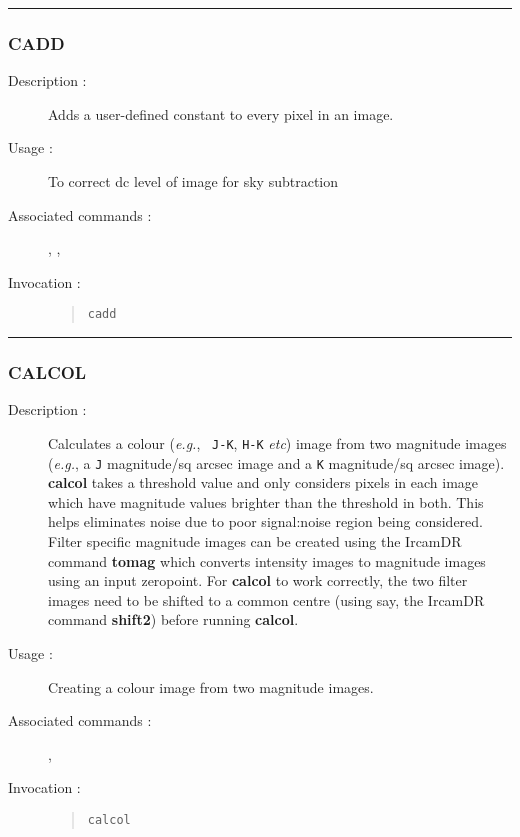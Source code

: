 \hrule 
\subsubsection*{\label{CADD}CADD}

\begin{description}

\item[Description :] Adds a user-defined constant to every pixel in an image.  

\item[Usage :] To correct dc level of image for sky subtraction

\item[Associated commands :] {\tt {}}, 
{\tt {}}, {\tt {}}

\item[Invocation :]

\begin{quote}{\tt  cadd  }\end{quote}

\end{description}

\hrule 
\subsubsection*{\label{CALCOL}CALCOL}

\begin{description}

\item[Description :] Calculates a colour (\emph{e.g.}, {\tt
J-K}, {\tt H-K} \emph{etc}) image from two magnitude images
(\emph{e.g.}, a {\tt J} magnitude/sq arcsec image and a {\tt K}
magnitude/sq arcsec image).  {\bf calcol} takes a threshold value and
only considers pixels in each image which have magnitude values
brighter than the threshold in both.  This helps eliminates noise due
to poor signal:noise region being considered.  Filter specific
magnitude images can be created using the {\sc IrcamDR} command {\bf
tomag} which converts intensity images to magnitude images using an
input zeropoint.  For {\bf calcol} to work correctly, the two filter
images need to be shifted to a common centre (using say, the {\sc
IrcamDR} command {\bf shift2}) before running {\bf calcol}.

\item[Usage :] Creating a colour image from two magnitude images.

\item[Associated commands :] {\tt {}}, 
{\tt {}}

\item[Invocation :]

\begin{quote}{\tt calcol }\end{quote}

\end{description}

